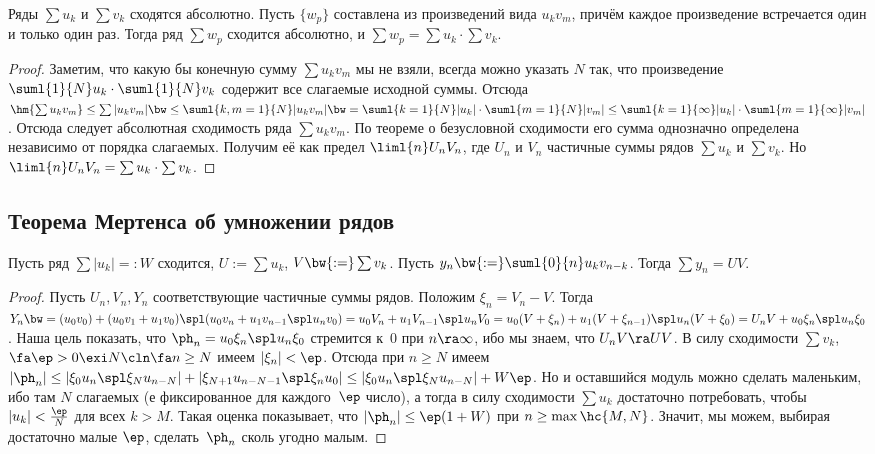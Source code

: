 \documentclass[a4paper]{article}
\begin{document}
\begin{theorem}
Ряды $\sum u_k$ и $\sum v_k$ сходятся абсолютно. Пусть $\{w_p\}$ составлена из
произведений вида $u_kv_m$, причём каждое произведение встречается один и только один раз.
Тогда ряд $\sum w_p$ сходится абсолютно, и $\sum w_p= \sum u_k \cdot \sum v_k$.
\end{theorem}
\begin{proof}
Заметим, что какую бы конечную сумму $\sum u_kv_m$ мы не взяли, всегда можно указать $N$ так, что произведение
$\suml{1}{N} u_k \cdot \suml{1}{N} v_k$ содержит все слагаемые исходной суммы. Отсюда
$\hm{\sum u_kv_m} \le \sum |u_kv_m| \bw\le \suml{k,m=1}{N}|u_kv_m| \bw= \suml{k=1}{N} |u_k| \cdot \suml{m=1}{N} |v_m|
\le \suml{k=1}{\infty}|u_k| \cdot \suml{m=1}{\infty} |v_m|$. Отсюда следует абсолютная сходимость ряда
$\sum u_kv_m$. По теореме о безусловной сходимости его сумма однозначно определена независимо от порядка слагаемых.
Получим её как предел $\liml{n} U_nV_n$, где $U_n$ и $V_n$ частичные суммы рядов $\sum u_k$ и $\sum v_k$.
Но $\liml{n} U_nV_n=\sum u_k \cdot \sum v_k$.
\end{proof}

\subsection{Теорема Мертенса об умножении рядов}

\begin{theorem}[Мертенса]
Пусть ряд $\sum |u_k| =:W$ сходится, $U := \sum u_k$, $V \bw{:=} \sum v_k$. Пусть $y_n \bw{:=} \suml{0}{n}u_kv_{n-k}$.
Тогда $\sum y_n = UV$.
\end{theorem}
\begin{proof}
Пусть $U_n, V_n, Y_n$ соответствующие частичные суммы рядов. Положим $\xi_n = V_n-V$. Тогда
$Y_n\bw= (u_0v_0)+(u_0v_1+u_1v_0)\spl (u_0v_n+u_1v_{n-1}\spl u_nv_0)=u_0V_n+u_1V_{n-1}\spl u_nV_0=
u_0(V+\xi_n)+u_1(V+\xi_{n-1})\spl u_n(V+\xi_0)=U_nV+u_0\xi_n\spl u_n\xi_0$. Наша цель показать, что
$\ph_n=u_0\xi_n\spl u_n\xi_0$ стремится к~0 при $n \ra \infty$, ибо мы знаем, что $U_nV \ra UV$.
В силу сходимости $\sum v_k$, $\fa \ep > 0 \exi N\cln \fa n \ge N$ имеем $|\xi_n|<\ep$. Отсюда при $n \ge N$ имеем
$|\ph_n| \le |\xi_0u_n\spl \xi_Nu_{n-N}| + |\xi_{N+1}u_{n-N-1} \spl \xi_nu_0| \le |\xi_0u_n\spl \xi_Nu_{n-N}| + W\ep$.
Но и оставшийся модуль можно сделать маленьким, ибо там $N$ слагаемых (е фиксированное для каждого~$\ep$ число), а тогда в силу сходимости
$\sum u_k$ достаточно потребовать, чтобы $|u_k| < \frac{\ep}{N}$ для всех $k > M$. Такая оценка показывает, что $|\ph_n| \le \ep(1+W)$
при $n \ge \max \hc{M,N}$.
Значит, мы можем, выбирая достаточно малые $\ep$, сделать~$\ph_n$ сколь угодно малым.
\end{proof}
\end{document}
